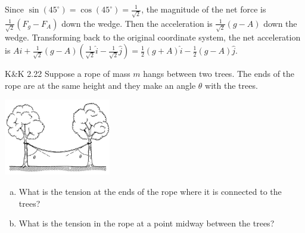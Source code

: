 \documentclass{esg8012pset}
\begin{document}
\begin{solution}
  Since $\sin(45^{\circ}) = \cos(45^{\circ}) = \frac{1}{\sqrt{2}}$, the magnitude of the net force is $\frac{1}{\sqrt{2}}(F_g - F_A)$ down the wedge.  Then the acceleration is $\frac{1}{\sqrt{2}}(g - A)$ down the wedge.  Transforming back to the original coordinate system, the net acceleration is $A \hat i + \frac{1}{\sqrt{2}}(g - A)\left(\frac{1}{\sqrt{2}}\hat i - \frac{1}{\sqrt{2}} \hat j\right) = \frac{1}{2}(g + A) \hat i - \frac{1}{2}(g - A)\hat j$.

\end{solution}


\begin{problem}{K\&K 2.22}
  Suppose a rope of mass $m$ hangs between two trees. The ends of the rope are at the same height and they make an angle $\theta$ with the trees.
  \begin{center}\includegraphics[width=0.35\textwidth]{ps02_5}\end{center}
  \begin{enumerate}[a)]
    \item What is the tension at the ends of the rope where it is connected to the trees?
    \item What is the tension in the rope at a point midway between the trees?
  \end{enumerate}
\end{problem}
\end{document}
